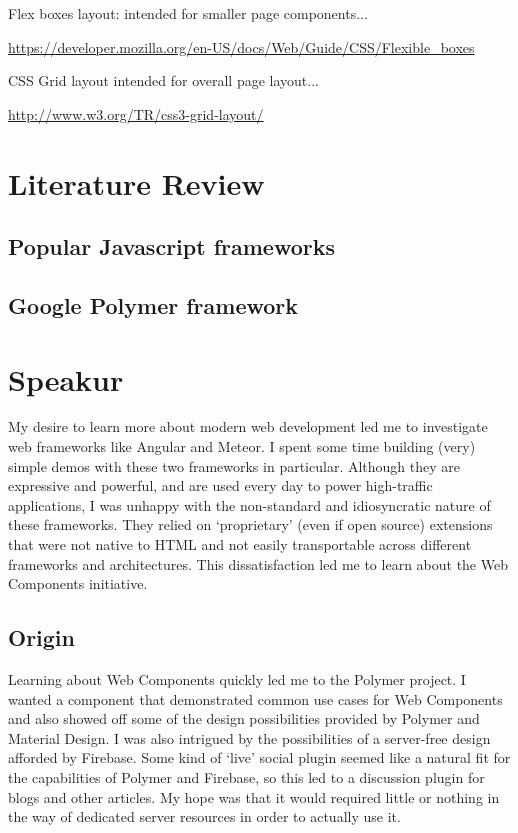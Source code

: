 Flex boxes layout: intended for smaller page components...

\url{https://developer.mozilla.org/en-US/docs/Web/Guide/CSS/Flexible_boxes}


CSS Grid layout intended for overall page layout...

\url{http://www.w3.org/TR/css3-grid-layout/}


\section{Literature Review}
\subsection{Popular Javascript frameworks}
\subsection{Google Polymer framework}

\section{Speakur}
My desire to learn more about modern web development led me to investigate web frameworks like Angular and Meteor.
I spent some time building (very) simple demos with these two frameworks in particular.
Although they are expressive and powerful, and are used every day to power high-traffic applications, 
I was unhappy with the non-standard and idiosyncratic nature of these frameworks. 
They relied on `proprietary' (even if open source) extensions that were not native to HTML and not easily transportable across different frameworks and architectures.
This dissatisfaction led me to learn about the Web Components initiative.

\subsection{Origin}
Learning about Web Components quickly led me to the Polymer project.
I wanted a component that demonstrated common use cases for Web Components and also showed off some of the design possibilities provided by Polymer and Material Design.
I was also intrigued by the possibilities of a server-free design afforded by Firebase.
Some kind of `live' social plugin seemed like a natural fit for the capabilities of Polymer and Firebase, so this led to a discussion plugin for blogs and other articles.
My hope was that it would required little or nothing in the way of dedicated server resources in order to actually use it. 

